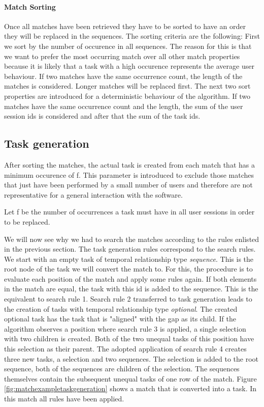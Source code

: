 \paragraph{Match Sorting}
Once all matches have been retrieved they have to be sorted to have an order they will be replaced in the sequences. The sorting criteria are the following:
First we sort by the number of occurence in all sequences.
The reason for this is that we want to prefer the most occurring match over all other match properties because it is likely that a task with a high occurence represents
the average user behaviour. If two matches have the same occurrence count, the length of the matches is considered. Longer matches will be replaced first.
The next two sort properties are introduced for a deterministic behaviour of the algorithm.
If two matches have the same occurrence count and the length, the sum of the user session ids is considered and after that the sum of the task ids.


\subsection{Task generation}
After sorting the matches, the actual task is created from each match that has a minimum occurence of f.
This parameter is introduced to exclude those matches that just have been performed by a small number of users and therefore are not representative for a general interaction with the software.
\begin{definition}
	\item Let f be the number of occurrences a task must have in all user sessions in order to be replaced.
		\label{def:minoccurrencecount}
\end{definition}
We will now see why we had to search the matches according to the rules enlisted in the previous section. The task generation rules correspond to the search rules.
We start with an empty task of temporal relationship type \textit{sequence}.
This is the root node of the task we will convert the match to.
For this, the procedure is to evaluate each position of the match and apply some rules again.
If both elements in the match are equal, the task with this id is added to the sequence. This is the equivalent to search rule 1.
Search rule 2 transferred to task generation leads to the creation of tasks with temporal relationship type \textit{optional}.
The created optional task has the task that is "aligned" with the gap as its child.
If the algorithm observes a position where search rule 3 is applied, a single selection with two children is created.
Both of the two unequal tasks of this position have this selection as their parent.
The adopted application of search rule 4 creates three new tasks, a selection and two sequences.
The selection is added to the root sequence, both of the sequences are children of the selection.
The sequences themselves contain the subsequent unequal tasks of one row of the match.
Figure \ref{fig:matchexampletaskgeneration} shows a match that is converted into a task. In this match all rules have been applied.

